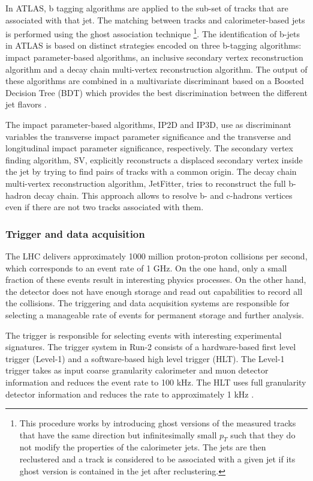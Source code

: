 In ATLAS, b tagging algorithms are applied to the sub-set of tracks that are associated with that jet. The matching between tracks and calorimeter-based jets is performed using the ghost association technique \cite{GhostAssociation}\footnote{This procedure works by introducing ghost versions of the measured tracks that have the same direction but infinitesimally small $p_T$ such that they do not modify the properties of the calorimeter jets. The jets are then reclustered and a track is considered to be associated with a given jet if its ghost version is contained in the jet after reclustering.}. The identification of b-jets in ATLAS is based on distinct strategies encoded on three b-tagging algorithms: impact parameter-based algorithms, an inclusive secondary vertex reconstruction algorithm and  a decay chain multi-vertex reconstruction algorithm. The output of these algorithms are combined in a multivariate discriminant based on a Boosted Decision Tree (BDT) which provides the best discrimination between the different jet flavors \cite{btagATLAS}.

The impact parameter-based algorithms, IP2D and IP3D, use as discriminant variables the transverse impact parameter significance and the transverse and longitudinal impact parameter significance, respectively. The secondary vertex finding algorithm, SV, explicitly reconstructs a displaced secondary vertex inside the jet by trying to find pairs of tracks with a common origin. The decay chain multi-vertex reconstruction algorithm, JetFitter, tries to reconstruct the full b-hadron decay chain. This approach allows to resolve b- and c-hadrons vertices even if there are not two tracks associated with them.

\subsubsection{Trigger and data acquisition}

The LHC delivers approximately 1000 million proton-proton collisions per second, which corresponds to an event rate of 1 GHz. On the one hand, only a small fraction of these events result in interesting physics processes. On the other hand, the detector does not have enough storage and read out capabilities to record all the collisions. The triggering and data acquisition systems are responsible for selecting a manageable rate of events for permanent storage and further analysis. 

The trigger is responsible for selecting events with interesting experimental signatures. The trigger system in Run-2 consists of a hardware-based first  level  trigger (Level-1) and a software-based high level trigger (HLT). The Level-1 trigger takes as input  coarse  granularity calorimeter and muon detector information and reduces the event rate to 100 kHz. The HLT uses full granularity detector information and reduces the rate to approximately 1 kHz \cite{run2trigger}.    

